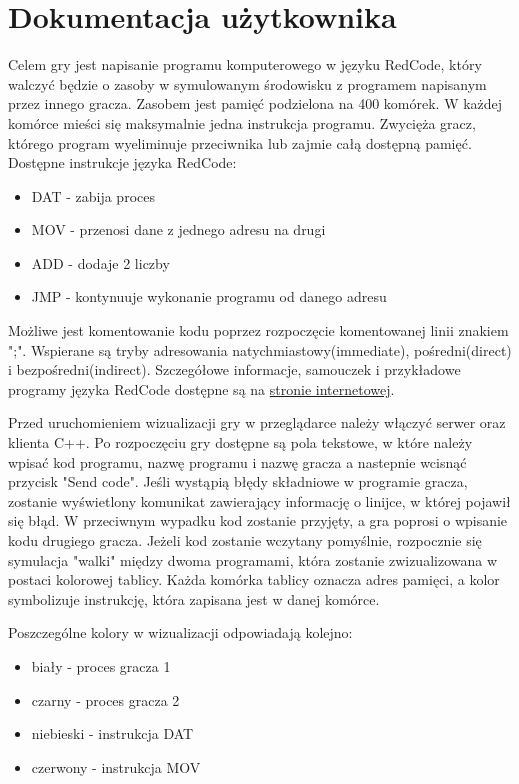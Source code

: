 \chapter{Dokumentacja użytkownika}
Celem gry jest napisanie programu komputerowego w języku RedCode, który walczyć będzie o zasoby w symulowanym środowisku z programem napisanym przez innego gracza. Zasobem jest pamięć podzielona na 400 komórek. W każdej komórce mieści się maksymalnie jedna instrukcja programu. Zwycięża gracz, którego program wyeliminuje przeciwnika lub zajmie całą dostępną pamięć.
Dostępne instrukcje języka RedCode:
\begin{itemize}
\item DAT - zabija proces
\item MOV - przenosi dane z jednego adresu na drugi
\item ADD - dodaje 2 liczby
\item JMP - kontynuuje wykonanie programu od danego adresu
\end{itemize}
Możliwe jest komentowanie kodu poprzez rozpoczęcie komentowanej linii znakiem ";".
Wspierane są tryby adresowania natychmiastowy(immediate), pośredni(direct) i bezpośredni(indirect). Szczegółowe informacje, samouczek i przykładowe programy języka RedCode dostępne są na \href{http://vyznev.net/corewar/guide.html}{stronie internetowej}.

Przed uruchomieniem wizualizacji gry w przeglądarce należy włączyć serwer oraz klienta C++. Po rozpoczęciu gry dostępne są pola tekstowe, w które należy wpisać kod programu, nazwę programu i nazwę gracza a nastepnie wcisnąć przycisk "Send code". Jeśli wystąpią błędy składniowe w programie gracza, zostanie wyświetlony komunikat zawierający informację o linijce, w której pojawił się błąd. W przeciwnym wypadku kod zostanie przyjęty, a gra poprosi o wpisanie kodu drugiego gracza. Jeżeli kod zostanie wczytany pomyślnie, rozpocznie się symulacja "walki" między dwoma programami, która zostanie zwizualizowana w postaci kolorowej tablicy. Każda komórka tablicy oznacza adres pamięci, a kolor symbolizuje instrukcję, która zapisana jest w danej komórce.

Poszczególne kolory w wizualizacji odpowiadają kolejno:
\begin{itemize}
\item biały - proces gracza 1
\item czarny - proces gracza 2
\item niebieski - instrukcja DAT
\item czerwony - instrukcja MOV
\end{itemize}